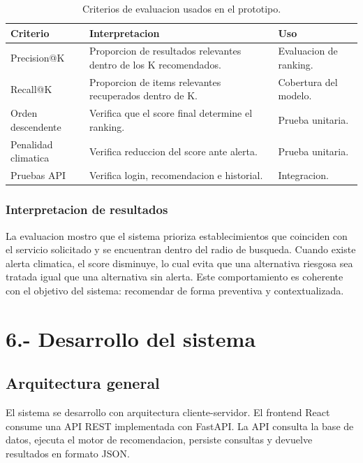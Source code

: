 \documentclass[12pt,a4paper]{article}
\begin{document}
\begin{table}[H]
\centering
\caption{Criterios de evaluacion usados en el prototipo.}
\label{tab:evaluacion}
\small
\begin{tabular}{p{3.5cm}p{6.5cm}p{3cm}}
\toprule
Criterio & Interpretacion & Uso \\
\midrule
Precision@K & Proporcion de resultados relevantes dentro de los K recomendados. & Evaluacion de ranking. \\
Recall@K & Proporcion de items relevantes recuperados dentro de K. & Cobertura del modelo. \\
Orden descendente & Verifica que el score final determine el ranking. & Prueba unitaria. \\
Penalidad climatica & Verifica reduccion del score ante alerta. & Prueba unitaria. \\
Pruebas API & Verifica login, recomendacion e historial. & Integracion. \\
\bottomrule
\end{tabular}
\end{table}

\subsubsection{Interpretacion de resultados}
La evaluacion mostro que el sistema prioriza establecimientos que coinciden con el servicio solicitado y se encuentran dentro del radio de busqueda. Cuando existe alerta climatica, el score disminuye, lo cual evita que una alternativa riesgosa sea tratada igual que una alternativa sin alerta. Este comportamiento es coherente con el objetivo del sistema: recomendar de forma preventiva y contextualizada.

\section{6.- Desarrollo del sistema}
\subsection{Arquitectura general}
El sistema se desarrollo con arquitectura cliente-servidor. El frontend React consume una API REST implementada con FastAPI. La API consulta la base de datos, ejecuta el motor de recomendacion, persiste consultas y devuelve resultados en formato JSON.
\end{document}
